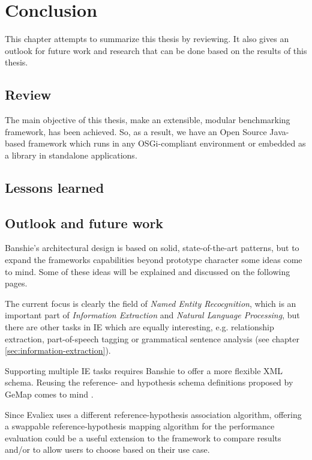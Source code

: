 \section{Conclusion}
\label{sec:conclusion}
This chapter attempts to summarize this thesis by reviewing. It also gives an outlook for future work and research that can be done based on the results of this thesis.

\subsection{Review}
The main objective of this thesis, make an extensible, modular benchmarking framework, has been achieved. So, as a result, we have an Open Source Java-based framework which runs in any \gls{OSGi}-compliant environment or embedded as a library in standalone applications.


\subsection{Lessons learned}

\subsection{Outlook and future work}
Banshie's architectural design is based on solid, state-of-the-art patterns, but to expand the frameworks capabilities beyond prototype character some ideas come to mind. Some of these ideas will be explained and discussed on the following pages.

The current focus is clearly the field of \textit{Named Entity Recocgnition}, which is an important part of \textit{Information Extraction} and \textit{Natural Language Processing}, but there are other tasks in \gls{IE} which are equally interesting, e.g. relationship extraction, part-of-speech tagging or grammatical sentence analysis (see chapter \ref{sec:information-extraction}).

Supporting multiple \gls{IE} tasks requires Banshie to offer a more flexible XML schema. Reusing the reference- and hypothesis schema definitions proposed by GeMap comes to mind \cite{Linsmayr:2010b}.

Since Evaliex uses a different reference-hypothesis association algorithm, offering a swappable reference-hypothesis mapping algorithm for the performance evaluation could be a useful extension to the framework to compare results and/or to allow users to choose based on their use case.

